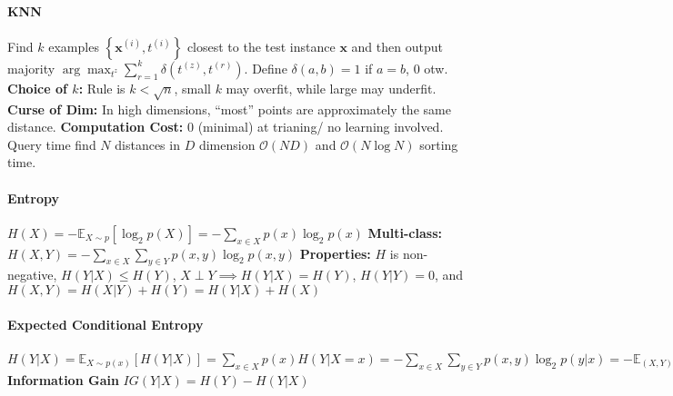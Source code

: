 \documentclass[10pt]{article}
\newcommand{\bx}{\mathbf{x}}
\begin{document}

\paragraph{KNN} Find $k$ examples $\left\{ \bx^{(i)}, t^{(i)} \right\}$ closest to the test instance $\bx$ and then output majority $\arg \max_{t^{z}} \sum_{r = 1}^k \delta (t^{(z)}, t^{(r)})$. Define $\delta (a, b) = 1$ if $a = b$, $0$ otw. \textbf{Choice of $k$:} Rule is $k < \sqrt{n}$, small $k$ may overfit, while large may underfit. \textbf{Curse of Dim:} In high dimensions, ``most'' points are approximately the same distance. \textbf{Computation Cost:} 0 (minimal) at trianing/ no learning involved. Query time find $N$ distances in $D$ dimension $\mathcal{O}(ND)$ and $\mathcal{O}(N \log N)$ sorting time.
\paragraph{Entropy} $H(X)=-\mathbb{E}_{X \sim p}\left[\log _{2} p(X)\right]=-\sum_{x \in X} p(x) \log _{2} p(x)$ \textbf{ Multi-class: } $H(X, Y)=-\sum_{x \in X} \sum_{y \in Y} p(x, y) \log _{2} p(x, y)$ \textbf{ Properties: } $H$ is non-negative, $H(Y|X) \leq H(Y)$, $X\perp Y \implies H(Y|X) = H(Y)$, $H(Y|Y) = 0$, and $H(X,Y) = H(X|Y) + H(Y) = H(Y|X) + H(X)$
\paragraph{Expected Conditional Entropy} $ H(Y | X) =\mathbb{E}_{X \sim p(x)}[H(Y | X)] =\sum_{x \in X} p(x) H(Y | X=x) =-\sum_{x \in X} \sum_{y \in Y} p(x, y) \log _{2} p(y | x) =-\mathbb{E}_{(X, Y) \sim p(x, y)}\left[\log _{2} p(Y | X)\right]$ \textbf{Information Gain} $IG(Y | X)=H(Y)-H(Y | X)$ 
\end{document}
